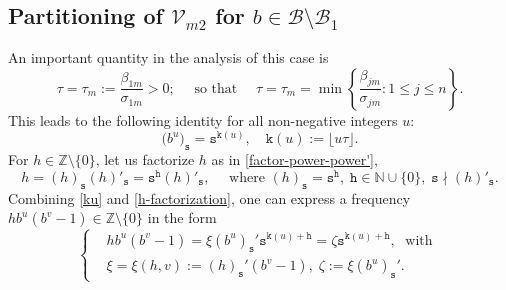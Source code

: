 \documentclass[12pt, twoside]{article}
\theoremstyle{definition}
\numberwithin{equation}{section}
\begin{document}
\subsection{Partitioning of $\mathcal V_{m2}$ for $b \in \mathscr{B} \setminus \mathscr{B}_1$} 
\noindent An important quantity in the analysis of this case is
\begin{equation} \label{what-is-taum}
\tau = \tau_m := \frac{\beta_{1m}}{\sigma_{1m}} > 0; \quad  \text{ so that } \quad \tau = \tau_m = \min \left\{\frac{ \beta_{jm}}{\sigma_{jm}} : 1 \leq j \leq n \right\}.
\end{equation}  
This leads to the following identity for all non-negative integers $u$:
\begin{equation} \label{ku}
\bigl(b^{u} \bigr)_{\mathtt s} = \mathtt s^{\mathtt k(u)}, \quad \mathtt k(u) := \lfloor u \tau \rfloor. 
\end{equation}
For $h \in \mathbb Z \setminus \{0\}$, let us factorize $h$ as in \eqref{factor-power-power'}, 
\begin{equation} \label{h-factorization} 
h = (h)_{\mathtt s} (h)'_{\mathtt s} = \mathtt s^{\mathtt h} (h)'_{\mathtt s}, \quad  \text{ where } (h)_{\mathtt s} = \mathtt s^{\mathtt h}, \; \mathtt h \in \mathbb N \cup \{0\}, \; \mathtt s \nmid (h)'_{\mathtt s}. 
\end{equation}  
Combining \eqref{ku} and \eqref{h-factorization}, one can express a frequency $hb^u(b^v-1) \in \mathbb Z \setminus \{0\}$ in the form  
\begin{equation} \label{new-xi} 
\left\{
\begin{aligned} 
&{h}b^u(b^v-1) = \xi (b^u)_{\mathtt s}' \mathtt s^{\mathtt k(u) + \mathtt h} = \zeta \mathtt s^{\mathtt k(u) + \mathtt h}, \; \text{ with } \\ &\xi  = \xi(h, v) := (h)_{\mathtt s}'(b^v-1), \; \zeta := \xi (b^u)_{\mathtt s}'.  
\end{aligned} \right. 
\end{equation} 
\end{document}
